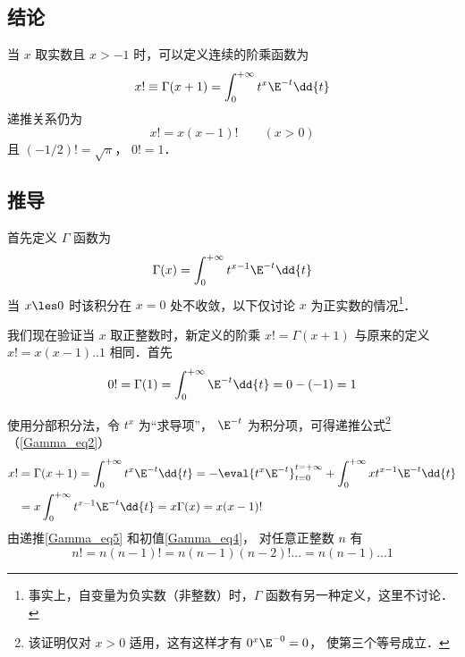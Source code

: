 

\subsection{结论}
当 $x$ 取实数且 $x>-1$ 时，可以定义连续的阶乘函数为
\begin{equation}
x! \equiv \Gamma (x + 1) = \int_0^{+\infty} t^x \E^{-t} \dd{t}
\end{equation}
递推关系仍为
\begin{equation}\label{Gamma_eq2}
x!=x(x-1)! \qquad (x>0)
\end{equation}
且 $(-1/2)!=\sqrt{\pi}$，  $0! = 1$．

\subsection{推导}

首先定义 $\Gamma$  函数为
\begin{equation}
\Gamma(x) = \int_0^{+\infty} t^{x-1} \E^{-t} \dd{t}
\end{equation}
当 $x \les 0$ 时该积分在 $x=0$ 处不收敛，以下仅讨论 $x$ 为正实数的情况\footnote{事实上，自变量为负实数（非整数）时，$\Gamma$ 函数有另一种定义，这里不讨论．}．

我们现在验证当 $x$ 取正整数时，新定义的阶乘 $x! = \Gamma(x+1)$ 与原来的定义 $x! = x(x-1)..1$ 相同．首先
\begin{equation}\label{Gamma_eq4}
0! = \Gamma(1) = \int_0^{+\infty} \E^{-t} \dd{t} = 0 - (-1) = 1
\end{equation}

使用分部积分法，令 $t^x$ 为“求导项”， $\E^{-t}$ 为积分项，可得递推公式\footnote{该证明仅对 $x>0$ 适用，这有这样才有 $0^x \E^{-0} = 0$， 使第三个等号成立．}（\autoref{Gamma_eq2}）
\begin{equation}\label{Gamma_eq5}
\begin{aligned}
x! &= \Gamma(x+1) = \int_0^{+\infty} t^x \E^{-t} \dd{t} =  - \eval{t^x \E^{-t}}_{t=0}^{t=+\infty} + \int_0^{+\infty} x t^{x-1} \E^{-t} \dd{t} \\
&= x\int_0^{+\infty} t^{x-1} \E^{-t} \dd{t} = x\Gamma (x) = x(x-1)!
\end{aligned} \end{equation} 
由递推\autoref{Gamma_eq5} 和初值\autoref{Gamma_eq4}， 对任意正整数 $n$ 有
\begin{equation}
n! = n(n-1)! = n(n-1)(n-2)!... = n(n-1)...1
\end{equation}

